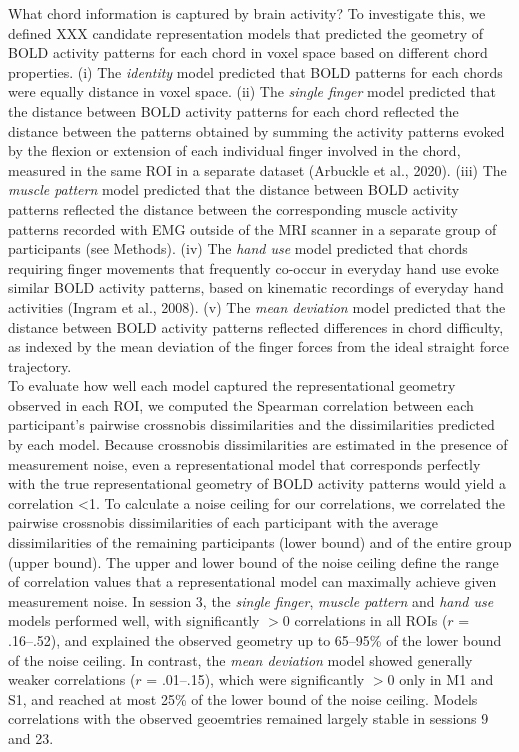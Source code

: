 \documentclass{article}
\begin{document}
What chord information is captured by brain activity? To investigate this, we defined XXX candidate representation models that predicted the geometry of BOLD activity patterns for each chord in voxel space based on different chord properties. (i) The \textit{identity} model predicted that BOLD patterns for each chords were equally distance in voxel space. (ii) The \textit{single finger} model predicted that the distance between BOLD activity patterns for each chord reflected the distance between the patterns obtained by summing the activity patterns evoked by the flexion or extension of each individual finger involved in the chord, measured in the same ROI in a separate dataset (Arbuckle et al., 2020). (iii) The \textit{muscle pattern} model predicted that the distance between BOLD activity patterns reflected the distance between the corresponding muscle activity patterns recorded with EMG outside of the MRI scanner in a separate group of participants (see Methods). (iv) The \textit{hand use} model predicted that chords requiring finger movements that frequently co-occur in everyday hand use evoke similar BOLD activity patterns, based on kinematic recordings of everyday hand activities (Ingram et al., 2008). (v) The \textit{mean deviation} model predicted that the distance between BOLD activity patterns reflected differences in chord difficulty, as indexed by the mean deviation of the finger forces from the ideal straight force trajectory. \\

To evaluate how well each model captured the representational geometry observed in each ROI, we computed the Spearman correlation between each participant's pairwise crossnobis dissimilarities and the dissimilarities predicted by each model. Because crossnobis dissimilarities are estimated in the presence of measurement noise, even a representational model that corresponds perfectly with the true representational geometry of BOLD activity patterns would yield a correlation <1. To calculate a noise ceiling for our correlations, we correlated the pairwise crossnobis dissimilarities of each participant with the average dissimilarities of the remaining participants (lower bound) and of the entire group (upper bound). The upper and lower bound of the noise ceiling define the range of correlation values that a representational model can maximally achieve given measurement noise. In session 3, the \textit{single finger}, \textit{muscle pattern} and \textit{hand use} models performed well, with significantly $>0$ correlations in all ROIs ($r$ = .16--.52), and explained the observed geometry up to 65--95\% of the lower bound of the noise ceiling. In contrast, the \textit{mean deviation} model showed generally weaker correlations ($r$ = .01--.15), which were significantly $>0$ only in M1 and S1, and reached at most 25\% of the lower bound of the noise ceiling. Models correlations with the observed geoemtries remained largely stable in sessions 9 and 23. \\
\end{document}
